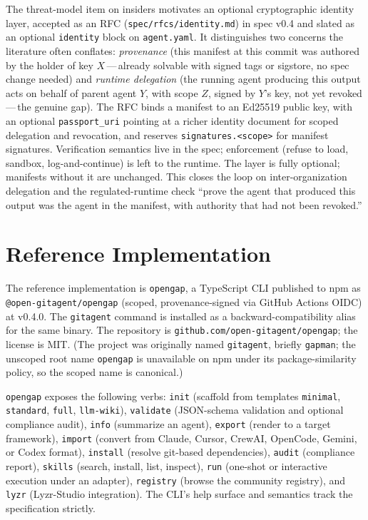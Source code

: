 \documentclass[11pt,a4paper]{article}
\begin{document}
The threat-model item on insiders motivates an optional cryptographic identity layer,
accepted as an RFC (\texttt{spec/rfcs/identity.md}) in spec v0.4 and slated as an
optional \texttt{identity} block on \texttt{agent.yaml}. It distinguishes two concerns
the literature often conflates: \emph{provenance} (this manifest at this commit was
authored by the holder of key $X$\,---\,already solvable with signed tags or sigstore,
no spec change needed) and \emph{runtime delegation} (the running agent producing this
output acts on behalf of parent agent $Y$, with scope $Z$, signed by $Y$'s key, not yet
revoked\,---\,the genuine gap). The RFC binds a manifest to an Ed25519 public key, with
an optional \texttt{passport\_uri} pointing at a richer identity document for scoped
delegation and revocation, and reserves \texttt{signatures.<scope>} for manifest
signatures. Verification semantics live in the spec; enforcement (refuse to load,
sandbox, log-and-continue) is left to the runtime. The layer is fully optional;
manifests without it are unchanged. This closes the loop on inter-organization
delegation and the regulated-runtime check ``prove the agent that produced this output
was the agent in the manifest, with authority that had not been revoked.''

\section{Reference Implementation}\label{sec:impl}

The reference implementation is \texttt{opengap}, a TypeScript CLI published to npm as
\texttt{@open-gitagent/opengap} (scoped, provenance-signed via GitHub Actions OIDC) at
v0.4.0. The \texttt{gitagent} command is installed as a backward-compatibility alias
for the same binary. The repository is \texttt{github.com/open-gitagent/opengap}; the
license is MIT. (The project was originally named \texttt{gitagent}, briefly
\texttt{gapman}; the unscoped root name \texttt{opengap} is unavailable on npm under its
package-similarity policy, so the scoped name is canonical.)

\texttt{opengap} exposes the following verbs: \texttt{init} (scaffold from templates
\texttt{minimal}, \texttt{standard}, \texttt{full}, \texttt{llm-wiki}),
\texttt{validate} (JSON-schema validation and optional compliance audit),
\texttt{info} (summarize an agent), \texttt{export} (render to a target framework),
\texttt{import} (convert from Claude, Cursor, CrewAI, OpenCode, Gemini, or Codex
format), \texttt{install} (resolve git-based dependencies), \texttt{audit}
(compliance report), \texttt{skills} (search, install, list, inspect),
\texttt{run} (one-shot or interactive execution under an adapter),
\texttt{registry} (browse the community registry), and \texttt{lyzr} (Lyzr-Studio
integration). The CLI's help surface and semantics track the specification strictly.
\end{document}
